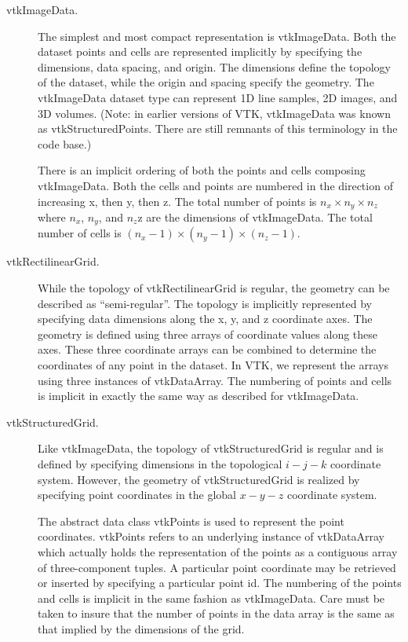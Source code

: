 \begin{description}

\item[vtkImageData.] The simplest and most compact representation is vtkImageData. Both the dataset points and cells are represented implicitly by specifying the dimensions, data spacing, and origin. The dimensions define the topology of the dataset, while the origin and spacing specify the geometry. The vtkImageData dataset type can represent 1D line samples, 2D images, and 3D volumes. (Note: in earlier versions of VTK, vtkImageData was known as vtkStructuredPoints. There are still remnants of this terminology in the code base.)

There is an implicit ordering of both the points and cells composing vtkImageData. Both the cells and points are numbered in the direction of increasing x, then y, then z. The total number of points is $n_x \times n_y \times n_z$ where $n_x$, $n_y$, and $n_z$z are the dimensions of vtkImageData. The total number of cells is $(n_x - 1) \times  (n_y - 1) \times (n_z - 1)$.

\item[vtkRectilinearGrid.] While the topology of vtkRectilinearGrid is regular, the geometry can be described as ``semi-regular''. The topology is implicitly represented by specifying data dimensions along the x, y, and z coordinate axes. The geometry is defined using three arrays of coordinate values along these axes. These three coordinate arrays can be combined to determine the coordinates of any point in the dataset. In VTK, we represent the arrays using three instances of vtkDataArray. The numbering of points and cells is implicit in exactly the same way as described for vtkImageData.

\item[vtkStructuredGrid.] Like vtkImageData, the topology of vtkStructuredGrid is regular and is defined by specifying dimensions in the topological $i-j-k$ coordinate system. However, the geometry of vtkStructuredGrid is realized by specifying point coordinates in the global $x-y-z$ coordinate system.

The abstract data class vtkPoints is used to represent the point coordinates. vtkPoints refers to an underlying instance of vtkDataArray which actually holds the representation of the points as a contiguous array of three-component tuples. A particular point coordinate may be retrieved or inserted by specifying a particular point id. The numbering of the points and cells is implicit in the same fashion as vtkImageData. Care must be taken to insure that the number of points in the data array is the same as that implied by the dimensions of the grid.


\end{description}
